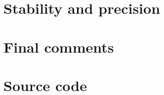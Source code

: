 \documentclass[a4paper,english, 10pt, twoside]{article}
\begin{document}
\section*{Stability and precision}
\section*{Final comments}
\section*{Source code}
\end{document}
